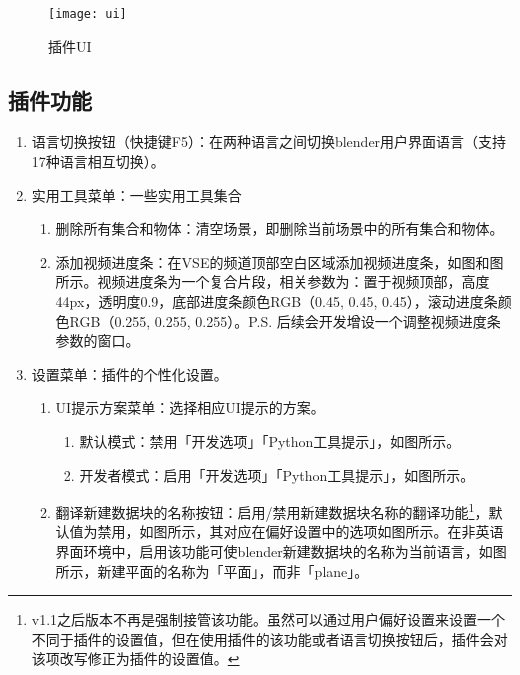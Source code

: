 \documentclass{../../public_resources/doc}
\begin{document}
\newpage

\begin{figure}[h!]
    \texttt{[image: ui]}
    \caption{插件UI}
    \label{插件UI}
\end{figure}

\subsection{插件功能}
\hypertarget{AddonFeatures}{}


\begin{enumerate}
    \item 语言切换按钮（快捷键F5）：在两种语言之间切换blender用户界面语言（支持17种语言相互切换）。
    \item 实用工具菜单：一些实用工具集合
    \begin{enumerate}
        \item 删除所有集合和物体：清空场景，即删除当前场景中的所有集合和物体。
        \item 添加视频进度条：在VSE的频道顶部空白区域添加视频进度条，如图和图所示。视频进度条为一个复合片段，相关参数为：置于视频顶部，高度44px，透明度0.9，底部进度条颜色RGB（0.45, 0.45, 0.45），滚动进度条颜色RGB（0.255, 0.255, 0.255）。P.S. 后续会开发增设一个调整视频进度条参数的窗口。
    \end{enumerate}
    \item 设置菜单：插件的个性化设置。
    \begin{enumerate}
        \item UI提示方案菜单：选择相应UI提示的方案。
        \begin{enumerate}
            \item 默认模式：禁用「开发选项」「Python工具提示」，如图所示。
            \item 开发者模式：启用「开发选项」「Python工具提示」，如图所示。
        \end{enumerate}
        \item 翻译新建数据块的名称按钮：启用/禁用新建数据块名称的翻译功能\footnote{v1.1之后版本不再是强制接管该功能。虽然可以通过用户偏好设置来设置一个不同于插件的设置值，但在使用插件的该功能或者语言切换按钮后，插件会对该项改写修正为插件的设置值。}，默认值为禁用，如图所示，其对应在偏好设置中的选项如图所示。在非英语界面环境中，启用该功能可使blender新建数据块的名称为当前语言，如图所示，新建平面的名称为「平面」，而非「plane」。

\end{enumerate}
\end{enumerate}
\end{document}
